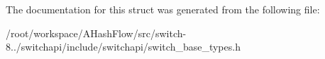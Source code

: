 The documentation for this struct was generated from the following file\+:\begin{DoxyCompactItemize}
\item 
/root/workspace/\+A\+Hash\+Flow/src/switch-\/8../switchapi/include/switchapi/switch\+\_\+base\+\_\+types.\+h\end{DoxyCompactItemize}

